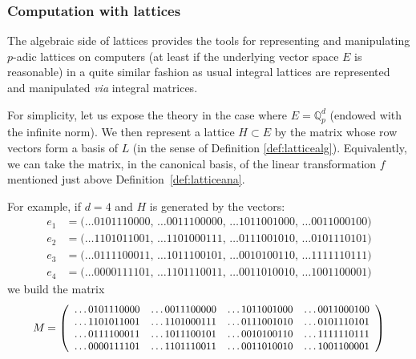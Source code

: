 \documentclass[11pt]{article}
\numberwithin{equation}{section}
\numberwithin{figure}{section}
\theoremstyle{definition}
\newcommand{\Q}{\mathbb Q}
\newcommand{\Qp}{\Q_p}
\begin{document}
\subsubsection{Computation with lattices}
\label{sssec:complattices}

The algebraic side of lattices provides the tools for representing and 
manipulating $p$-adic lattices on computers (at least if the underlying 
vector space $E$ is reasonable) in a quite similar fashion as usual
integral lattices are represented and manipulated \emph{via} integral
matrices.

For simplicity, let us expose the theory in the case where $E = \Qp^d$ 
(endowed with the infinite norm). We then represent a lattice $H \subset 
E$ by the matrix whose row vectors form a 
basis of $L$ (in the sense of Definition \ref{def:latticealg}). 
Equivalently, we can take the matrix, in the canonical basis, of the 
linear transformation $f$ mentioned just above Definition~\ref{def:latticeana}.

For example, if $d = 4$ and $H$ is generated by the vectors:
\begin{align*}
e_1 & = 
\big(\ldots0101110000,\, \ldots0011100000,\, \ldots1011001000,\, \ldots0011000100\big) \\
e_2 & = 
\big(\ldots1101011001,\, \ldots1101000111,\, \ldots0111001010,\, \ldots0101110101\big) \\
e_3 & = 
\big(\ldots0111100011,\, \ldots1011100101,\, \ldots0010100110,\, \ldots1111110111\big) \\
e_4 & = 
\big(\ldots0000111101,\, \ldots1101110011,\, \ldots0011010010,\, \ldots1001100001\big)
\end{align*}
we build the matrix
\begin{equation}
\label{eq:examplelattice}
\begin{array}{r@{\hspace{0.5ex}}l}
M & = 
\small \left(\begin{array}{rrrr}
\ldots0101110000 & \ldots0011100000 & \ldots1011001000 & \ldots0011000100 \\
\ldots1101011001 & \ldots1101000111 & \ldots0111001010 & \ldots0101110101 \\
\ldots0111100011 & \ldots1011100101 & \ldots0010100110 & \ldots1111110111 \\
\ldots0000111101 & \ldots1101110011 & \ldots0011010010 & \ldots1001100001
\end{array}\right)
\end{array}
\end{equation}
\end{document}
